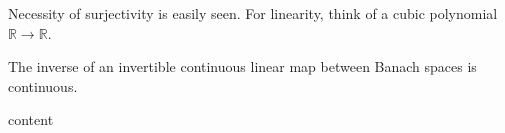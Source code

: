 	\begin{rmk}
		Necessity of surjectivity is easily seen. For linearity, think of a cubic polynomial $\mathbb {R\to R}$.
	\end{rmk}
	
	\begin{cor}
		The inverse of an invertible continuous linear map between Banach spaces is continuous.
	\end{cor}
	
	\begin{rmk}
		content
	\end{rmk}